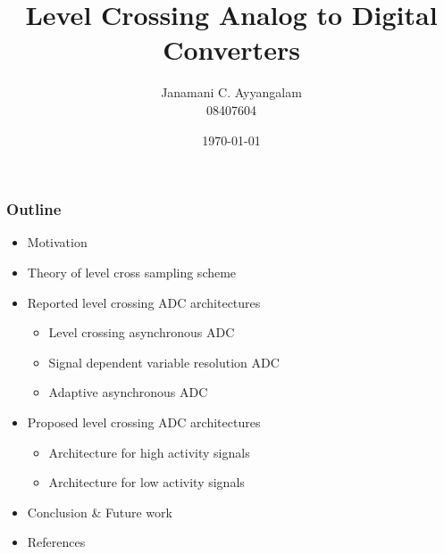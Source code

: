 \documentclass{beamer}
\title{Level Crossing Analog to Digital Converters}
\author[Janamani Chandram Ayyangalam]{Janamani C. Ayyangalam \\  08407604 }
\institute[IIT Bombay]{Under the Guidance of \\ \vspace{3 mm} \begin{large} Prof. A. N. Chandorkar \end{large} }
\date[\today]{\today}
\begin{document}
\begin{frame}
\titlepage
\end{frame}
\begin{frame}
	\frametitle{Outline} 
	\begin{itemize} 
		\item{ Motivation }\\
		\item{ Theory of level cross sampling scheme }\\
		\item{ Reported level crossing ADC architectures }\\ 
			\begin{itemize} \footnotesize
				\item{ Level crossing asynchronous ADC }
				\item{ Signal dependent variable resolution ADC }
				\item{ Adaptive asynchronous ADC }
			\end{itemize}
		\item{ Proposed level crossing ADC architectures }
			\begin{itemize} \footnotesize
				\item{ Architecture for high activity signals }
				\item{ Architecture for low activity signals }
			\end{itemize}
		\item{ Conclusion \& Future work }\\
		\item{ References }		
        \end{itemize}
\end{frame}
\end{document}
